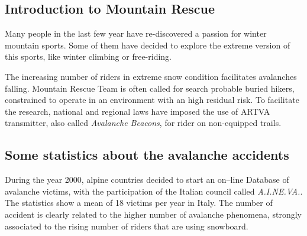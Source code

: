 
\begin{fullwidth}
\chapter{Introduction to Mountain Rescue \label{ch:chapter1}}
\end{fullwidth}
\minitoc
\thispagestyle{plain}

Many people in the last few year have re-discovered a passion for winter mountain sports. Some of them have decided to explore the extreme version of this sports, like winter climbing or free-riding.

The increasing number of riders in extreme snow condition facilitates avalanches falling. Mountain Rescue Team is often called for search probable buried hikers, constrained to operate in an environment with an high residual risk. To facilitate the research, national and regional laws\cite[-1cm]{ARTVAobbligationLaw} have imposed the use of ARTVA transmitter, also called \emph{Avalanche Beacons}, for rider on non-equipped trails.

\section{Some statistics about the avalanche accidents}

During the year 2000, alpine countries decided to start an on--line Database of avalanche victims, with the participation of the Italian council called \emph{A.I.NE.VA.}. The statistics show a mean of 18 victims per year in Italy. The number of accident is clearly related to the higher number of avalanche phenomena, strongly associated to the rising number of riders that are using snowboard. 

